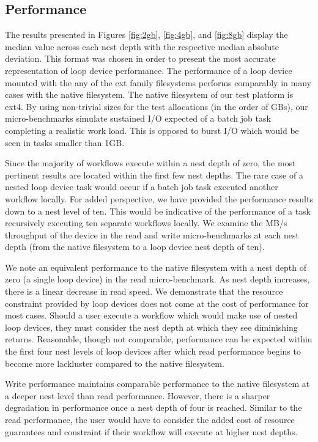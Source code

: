 \documentclass[conference]{IEEEtran}
\begin{document}
\subsection{Performance}
The results presented in Figures \ref{fig:2gb}, \ref{fig:4gb}, and \ref{fig:8gb} display the median value across each nest depth with the respective median absolute deviation. This format was chosen in order to present the most accurate representation of loop device performance. The performance of a loop device mounted with the any of the ext family filesystems performs comparably in many cases with the native filesystem. The native filesystem of our test platform is ext4. By using non-trivial sizes for the test allocations (in the order of GBs), our micro-benchmarks simulate sustained I/O expected of a batch job task completing a realistic work load. This is opposed to burst I/O which would be seen in tasks smaller than 1GB. 

Since the majority of workflows execute within a nest depth of zero, the most pertinent results are located within the first few nest depths. The rare case of a nested loop device task would occur if a batch job task executed another workflow locally. For added perspective, we have provided the performance results down to a nest level of ten. This would be indicative of the performance of a task recursively executing ten separate workflows locally. 
We examine the MB/s throughput of the device in the read and write micro-benchmarks at each nest depth (from the native filesystem to a loop device nest depth of ten).

 We note an equivalent performance to the native filesystem with a nest depth of zero (a single loop device) in the read micro-benchmark. As nest depth increases, there is a linear decrease in read speed. We demonstrate that the resource constraint provided by loop devices does not come at the cost of performance for most cases. Should a user execute a workflow which would make use of nested loop devices, they must consider the nest depth at which they see diminishing returns. Reasonable, though not comparable, performance can be expected within the first four nest levels of loop devices after which read performance begins to become more lackluster compared to the native filesystem.

Write performance maintains comparable performance to the native filesystem at a deeper nest level than read performance. However, there is a sharper degradation in performance once a nest depth of four is reached. Similar to the read performance, the user would have to consider the added cost of resource guarantees and constraint if their workflow will execute at higher nest depths. 
\end{document}
